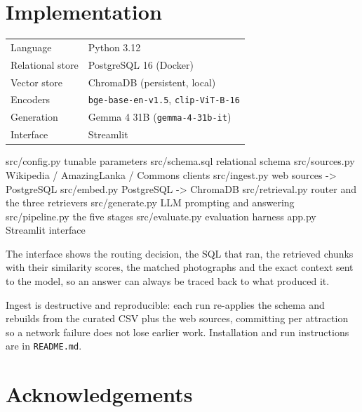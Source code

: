 \documentclass[11pt,a4paper]{article}
\newcommand{\code}[1]{\texttt{\small #1}}
\begin{document}
\section{Implementation}

\begin{center}
\begin{tabular}{@{}ll@{}}
\toprule
Language         & Python 3.12 \\
Relational store & PostgreSQL 16 (Docker) \\
Vector store     & ChromaDB (persistent, local) \\
Encoders         & \code{bge-base-en-v1.5}, \code{clip-ViT-B-16} \\
Generation       & Gemma 4 31B (\code{gemma-4-31b-it}) \\
Interface        & Streamlit \\
\bottomrule
\end{tabular}
\end{center}

\begin{codeblock}
src/config.py     tunable parameters
src/schema.sql    relational schema
src/sources.py    Wikipedia / AmazingLanka / Commons clients
src/ingest.py     web sources -> PostgreSQL
src/embed.py      PostgreSQL -> ChromaDB
src/retrieval.py  router and the three retrievers
src/generate.py   LLM prompting and answering
src/pipeline.py   the five stages
src/evaluate.py   evaluation harness
app.py            Streamlit interface
\end{codeblock}

The interface shows the routing decision, the SQL that ran, the retrieved
chunks with their similarity scores, the matched photographs and the exact
context sent to the model, so an answer can always be traced back to what
produced it.

Ingest is destructive and reproducible: each run re-applies the schema and
rebuilds from the curated CSV plus the web sources, committing per attraction
so a network failure does not lose earlier work. Installation and run
instructions are in \code{README.md}.

\section*{Acknowledgements}
\end{document}
